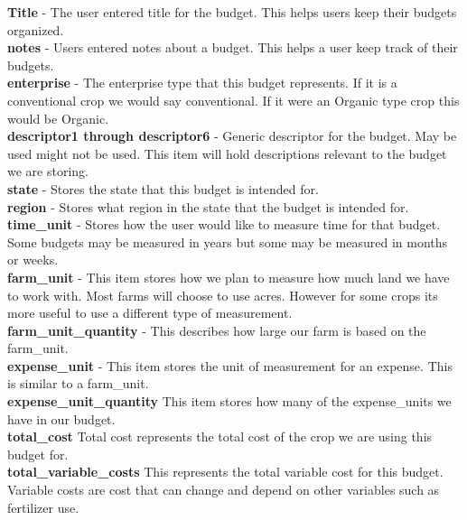 \documentclass[onecolumn, draftclsnofoot,10pt, compsoc]{article}
\begin{document}
				\textbf{Title} - The user entered title for the budget. This helps users keep their budgets organized.\\

				\textbf{notes} - Users entered notes about a budget. This helps a user keep track of their budgets.\\

				\textbf{enterprise} - The enterprise type that this budget represents. If it is a conventional crop we would say conventional. If it were an Organic type crop this would be Organic.\\

				\textbf{descriptor1 through descriptor6} - Generic descriptor for the budget. May be used might not be used. This item will hold descriptions relevant to the budget we are storing.\\

				\textbf{state} - Stores the state that this budget is intended for.\\

				\textbf{region} - Stores what region in the state that the budget is intended for.\\

				\textbf{time\_unit} - Stores how the user would like to measure time for that budget. Some budgets may be measured in years but some may be measured in months or weeks.\\

				\textbf{farm\_unit} - This item stores how we plan to measure how much land we have to work with. Most farms will choose to use acres. However for some crops its more useful to use a different type of measurement.\\

				\textbf{farm\_unit\_quantity} - This describes how large our farm is based on the farm\_unit.\\

				\textbf{expense\_unit} - This item stores the unit of measurement for an expense. This is similar to a farm\_unit.\\

				\textbf{expense\_unit\_quantity} \- This item stores how many of the expense\_units we have in our budget.\\

				\textbf{total\_cost} \- Total cost represents the total cost of the crop we are using this budget for.\\

				\textbf{total\_variable\_costs} \- This represents the total variable cost for this budget. Variable costs are cost that can change and depend on other variables such as fertilizer use.\\
\end{document}
